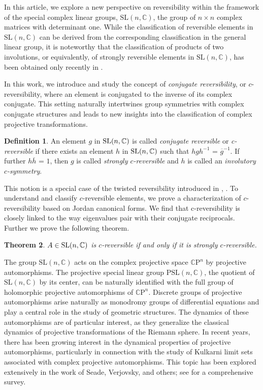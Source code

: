 \documentclass[11pt]{amsart}
\numberwithin{equation}{section}
\theoremstyle{plain}
\newtheorem{theorem}{Theorem}[section]
\theoremstyle{definition}
\newtheorem{defn}[theorem]{Definition}
\newcommand{\C}{\mathbb{C}}
\numberwithin{equation}{section}
\def \SL{ {\rm SL}}
\begin{document}
    In this article, we explore a new perspective on reversibility within the framework of the special complex linear groups, $\mathrm{SL}(n, \mathbb{C})$, the group of $n \times n$ complex matrices with determinant one. While the classification of reversible elements in $\mathrm{SL}(n, \mathbb{C})$ can be derived from the corresponding classification in the general linear group, it is noteworthy that the classification of products of two involutions, or equivalently, of  strongly reversible elements in $\mathrm{SL}(n, \mathbb{C})$, has been obtained only recently in  \cite{GLM2}. 
    
    In this work, we introduce and study the concept of \emph{conjugate reversibility}, or $c$-reversibility, where an element is conjugated to the inverse of its complex conjugate. This setting naturally intertwines group symmetries with complex conjugate structures and leads to new insights into the classification of complex projective transformations.

  
\begin{defn}
An element $g$ in $\SL(n, \C)$ is called \emph{conjugate reversible} or \emph{c-reversible} if there exists an element $h$ in $\SL(n, \C)$ such that $hgh^{-1}$ = $\overline{g}^{-1}$. 
 If further $h \overline h$ = $1$, then $g$ is called \emph{strongly $c$-reversible} and $h$ is called an \emph{involutory $c$-symmetry}.
	\end{defn}
This notion is a special case of the twisted reversibility introduced in \cite{gms}, \cite{dc}. To understand and classify $c$-reversible elements, we prove a characterization of $c$-reversibility based on Jordan canonical forms. We find that c-reversibility is closely linked to the way eigenvalues pair with their conjugate reciprocals. Further we prove the following theorem.
\begin{theorem}\label{2.8}
		$A \in \SL(n,\mathbb{C})$ is $c$-reversible if and only if it is strongly $c$-reversible.
	\end{theorem}
    The group $\mathrm{SL}(n, \mathbb{C})$ acts on the complex projective space $\mathbb{C}\mathrm{P}^n$ by projective automorphisms. The projective special linear group $\mathrm{PSL}(n, \mathbb{C})$,  the quotient of $\mathrm{SL}(n, \mathbb{C})$ by its center, can be naturally identified with the full group of holomorphic projective automorphisms of $\mathbb{C}\mathrm{P}^n$.  Discrete groups of projective automorphisms arise naturally as monodromy groups of differential equations and play a central role in the study of geometric structures. The dynamics of these automorphisms are of particular interest, as they generalize the classical dynamics of projective transformations of the Riemann sphere.  In recent years, there has been growing interest in the dynamical properties of projective automorphisms, particularly in connection with the study of Kulkarni limit sets associated with complex projective automorphisms. This topic has been explored extensively in the work of Seade, Verjovsky, and others; see \cite{cns} for a comprehensive survey.
    
\end{document}
